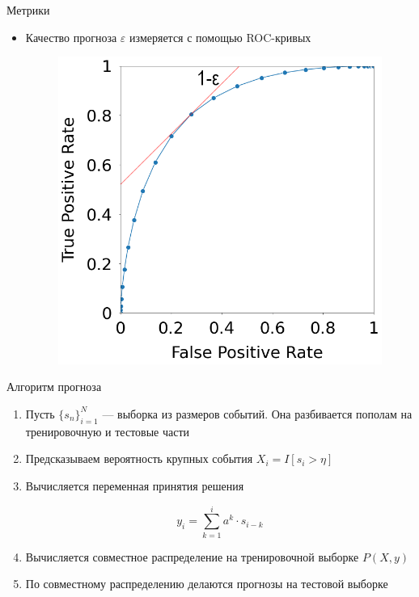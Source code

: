 \documentclass{beamer}
\begin{document}
	\begin{frame}{Метрики}
		\begin{itemize}
			\item<1-> Качество прогноза $\varepsilon$ измеряется с помощью ROC-кривых
			\begin{figure}[h]
				\centering
				\includegraphics[width=0.5\linewidth]{slides/roc_curve_eps}
			\end{figure}
		\end{itemize}
	\end{frame}

	\begin{frame}{Алгоритм прогноза}
		\begin{enumerate}
			\item Пусть $\{s_n\}_{i=1}^{N}$ --- выборка из размеров событий. Она разбивается пополам на тренировочную и тестовые части
			\item Предсказываем вероятность крупных события $X_i = I[s_i > \eta]$
			\item Вычисляется переменная принятия решения
			
			$$ y_i = \sum\limits_{k=1}^{i} a^k \cdot s_{i-k} $$
			
			\item Вычисляется совместное распределение на тренировочной выборке $P(X,y)$
			\item По совместному распределению делаются прогнозы на тестовой выборке
		\end{enumerate}
	\end{frame}
\end{document}
